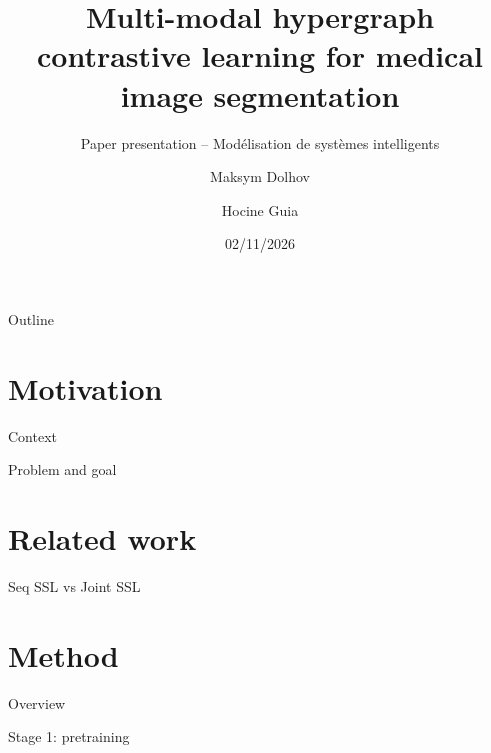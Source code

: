 \documentclass[aspectratio=169,10pt]{beamer}
\title{Multi-modal hypergraph contrastive learning for medical image segmentation}
\subtitle{Paper presentation -- Modélisation de systèmes intelligents}
\author{Maksym Dolhov \and Hocine Guia}
\institute{M2 Informatique VMI, Université Paris Cité}
\date{02/11/2026}
\begin{document}
\maketitle

\begin{frame}{Outline}
\end{frame}

\section{Motivation}

\begin{frame}{Context}
\end{frame}

\begin{frame}{Problem and goal}
\end{frame}

\section{Related work}

\begin{frame}{Seq SSL vs Joint SSL}
\end{frame}

\section{Method}

\begin{frame}{Overview}
\end{frame}

\begin{frame}{Stage 1: pretraining}
\end{frame}
\end{document}
